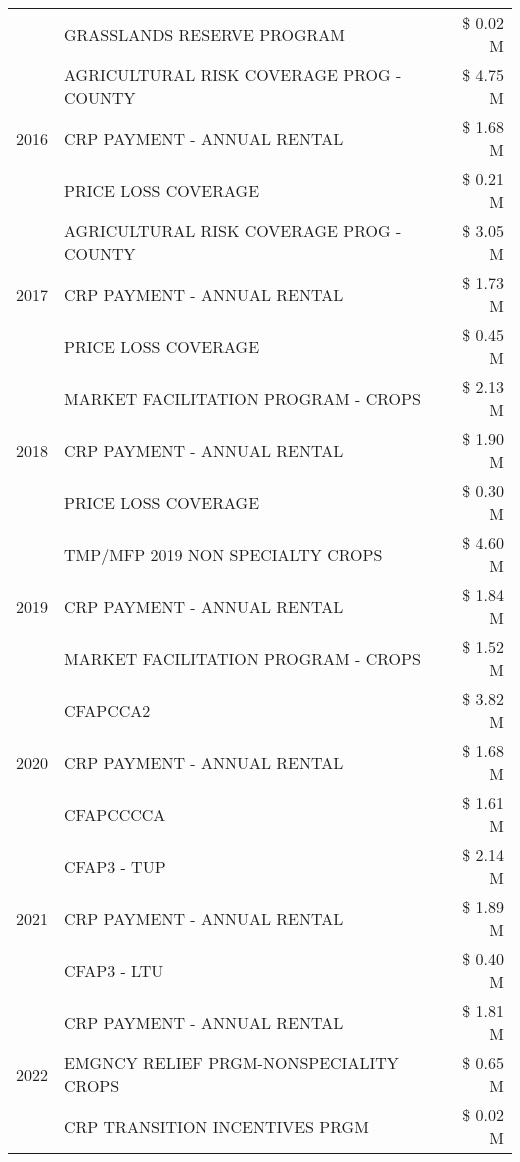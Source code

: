\begin{tabular}{llr}
 & GRASSLANDS RESERVE PROGRAM & \$ 0.02 M \\
\cline{1-3}
\multirow[t]{3}{*}{2016} & AGRICULTURAL RISK COVERAGE PROG - COUNTY & \$ 4.75 M \\
 & CRP PAYMENT - ANNUAL RENTAL & \$ 1.68 M \\
 & PRICE LOSS COVERAGE & \$ 0.21 M \\
\cline{1-3}
\multirow[t]{3}{*}{2017} & AGRICULTURAL RISK COVERAGE PROG - COUNTY & \$ 3.05 M \\
 & CRP PAYMENT - ANNUAL RENTAL & \$ 1.73 M \\
 & PRICE LOSS COVERAGE & \$ 0.45 M \\
\cline{1-3}
\multirow[t]{3}{*}{2018} & MARKET FACILITATION PROGRAM - CROPS & \$ 2.13 M \\
 & CRP PAYMENT - ANNUAL RENTAL & \$ 1.90 M \\
 & PRICE LOSS COVERAGE & \$ 0.30 M \\
\cline{1-3}
\multirow[t]{3}{*}{2019} & TMP/MFP 2019 NON SPECIALTY CROPS & \$ 4.60 M \\
 & CRP PAYMENT - ANNUAL RENTAL & \$ 1.84 M \\
 & MARKET FACILITATION PROGRAM - CROPS & \$ 1.52 M \\
\cline{1-3}
\multirow[t]{3}{*}{2020} & CFAPCCA2 & \$ 3.82 M \\
 & CRP PAYMENT - ANNUAL RENTAL & \$ 1.68 M \\
 & CFAPCCCCA & \$ 1.61 M \\
\cline{1-3}
\multirow[t]{3}{*}{2021} & CFAP3 - TUP & \$ 2.14 M \\
 & CRP PAYMENT - ANNUAL RENTAL & \$ 1.89 M \\
 & CFAP3 - LTU & \$ 0.40 M \\
\cline{1-3}
\multirow[t]{3}{*}{2022} & CRP PAYMENT - ANNUAL RENTAL & \$ 1.81 M \\
 & EMGNCY RELIEF PRGM-NONSPECIALITY CROPS & \$ 0.65 M \\
 & CRP TRANSITION INCENTIVES PRGM & \$ 0.02 M \\
\cline{1-3}
\bottomrule
\end{tabular}
